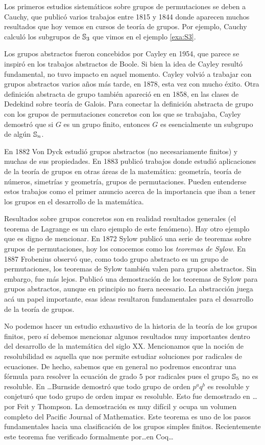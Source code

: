 Los primeros estudios sistemáticos sobre grupos de permutaciones se deben a Cauchy, que publicó varios trabajos entre 1815 y 1844 donde aparecen muchos resultados 
que hoy vemos en cursos de teoría de grupos. Por ejemplo, Cauchy calculó 
los subgrupos de $\mathbb{S}_3$ que vimos en el ejemplo \ref{exa:S3}. 

Los grupos abstractos fueron concebidos por Cayley en 1954, que parece se
inspiró en los trabajos abstractos de Boole. Si bien la idea de Cayley 
resultó fundamental, no tuvo impacto en aquel momento. Cayley volvió a trabajar
con grupos abstractos varios años más tarde, en 1878, esta vez con mucho éxito. 
Otra definición abstracta de grupo 
también apareció en en 1858, en las clases de Dedekind sobre teoría de Galois. Para conectar
la definición abstracta de grupo con los grupos de permutaciones concretos con los que 
se trabajaba, 
Cayley demostró que si $G$ es un grupo finito, entonces
$G$ es esencialmente un subgrupo de algún $\mathbb{S}_n$. 

En 1882 Von Dyck estudió grupos abstractos (no necesariamente finitos) y muchas de sus propiedades. En 1883 publicó trabajos donde estudió aplicaciones de la teoría de
grupos en otras áreas de la matemática: geometría, teoría de números, simetrías y geometría, grupos de permutaciones. Pueden entenderse estos trabajos como el primer anuncio
acerca de la importancia que iban a tener los grupos en el desarrollo de la matemática.  

Resultados sobre grupos concretos son en realidad resultados generales (el teorema de Lagrange es un claro ejemplo de este fenómeno). Hay otro ejemplo que es digno de mencionar. En 1872 Sylow
publicó una serie de teoremas sobre grupos de permutaciones, hoy los conocemos como
los \emph{teoremas de Sylow}. En 1887 Frobenius observó que, como todo grupo abstracto es un grupo de permutaciones, los teoremas de Sylow también valen para grupos abstractos. Sin embargo, fue más lejos. Publicó una demostración de los teoremas de Sylow para grupos abstractos, aunque en principio no fuera necesario. La abstracción juega acá un papel importante, esas ideas resultaron fundamentales 
para el desarrollo de la teoría de grupos. 

No podemos hacer un estudio exhaustivo de la historia de la teoría de los
grupos finitos, pero sí debemos mencionar algunos resultados muy importantes
dentro del desarrollo de la matemática del siglo XX.  Mencionamos que la noción
de resolubilidad es aquella que nos permite estudiar soluciones por radicales
de ecuaciones. De hecho, sabemos que en general no podremos encontrar una
fórmula para resolver la ecuación de grado $5$ por radicales pues el grupo
$\mathbb{S}_5$ no es resoluble.  En \dots Burnside demostró que todo grupo de orden
$p^a q^b$ es resoluble y conjeturó que todo grupo de orden impar es resoluble.
Esto fue demostrado en \dots por Feit y Thompson. La demostración es muy
difícil y ocupa un volumen completo del Pacific Journal of Mathematics.  Este
teorema es uno de los pasos fundamentales hacia una clasificación de los grupos
simples finitos.  Recientemente este teorema fue verificado formalmente
por\dots en Coq\dots

